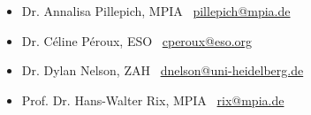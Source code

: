 \documentclass[a4paper,12pt,oneside]{article}
\begin{document}
\noindent{}
\begin{itemize}[wide, labelwidth=!, labelindent=-11pt, parsep=0pt, noitemsep]
    \item Dr. Annalisa Pillepich, MPIA \faEnvelope~\href{mailto:pillepich@mpia.de}{pillepich@mpia.de}
    \item Dr. C\'eline P\'eroux, ESO \faEnvelope~\href{mailto:cperoux@eso.org}{cperoux@eso.org}
    \item Dr. Dylan Nelson, ZAH \faEnvelope~\href{mailto:dnelson@uni-heidelberg.de}{dnelson@uni-heidelberg.de}
    \item Prof. Dr. Hans-Walter Rix, MPIA \faEnvelope~\href{mailto:rix@mpia.de}{rix@mpia.de}
    \end{itemize}
    
    \vspace{5.5pt}
\end{document}
